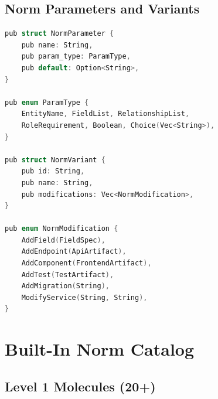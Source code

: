 \documentclass[11pt,a4paper]{article}
\begin{document}
\subsection{Norm Parameters and Variants}

\begin{lstlisting}[language=C]
pub struct NormParameter {
    pub name: String,
    pub param_type: ParamType,
    pub default: Option<String>,
}

pub enum ParamType {
    EntityName, FieldList, RelationshipList,
    RoleRequirement, Boolean, Choice(Vec<String>),
}

pub struct NormVariant {
    pub id: String,
    pub name: String,
    pub modifications: Vec<NormModification>,
}

pub enum NormModification {
    AddField(FieldSpec),
    AddEndpoint(ApiArtifact),
    AddComponent(FrontendArtifact),
    AddTest(TestArtifact),
    AddMigration(String),
    ModifyService(String, String),
}
\end{lstlisting}

\section{Built-In Norm Catalog}

\subsection{Level 1 Molecules (20+)}
\end{document}
